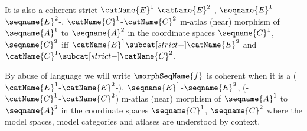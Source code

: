 \documentclass{article}
\begin{document}
\begin{definition}
It is also a coherent strict
\nobreaks
  {
    {$\catName{E}^1$-$\catName{E}^2$-},
    {$\seqname{E}^1$-$\seqname{E}^2$-},
    {$\catName{C}^1$-$\catName{C}^2$}
  }
m-atlas (near) morphism of $\seqname{A}^1$ to $\seqname{A}^2$ in the
coordinate spaces $\seqname{C}^1$, $\seqname{C}^2$ iff
$\catName{E}^1 \subcat[strict-] \catName{E}^2$ and
$\catName{C}^1 \subcat[strict-] \catName{C}^2$.

By abuse of language we will write $\morphSeqName{f}$ is coherent when it
is a
\nobreaks
  {
    {($\catName{E}^1$-$\catName{E}^2$-)},
    {$\seqname{E}^1$-$\seqname{E}^2$},
    {(-$\catName{C}^1$-$\catName{C}^2$)}
  }
m-atlas (near) morphism of $\seqname{A}^1$ to $\seqname{A}^2$ in the
coordinate spaces $\seqname{C}^1$, $\seqname{C}^2$ where the model
spaces, model categories and atlases are understood by context.
\end{definition}
\end{document}
